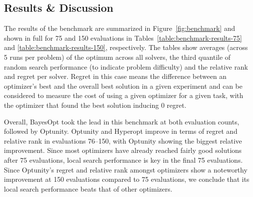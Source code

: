 \begin{subappendices}
\subsection{Results \& Discussion}
The results of the benchmark are summarized in Figure~\ref{fig:benchmark} and shown in full for 75 and 150 evaluations in Tables~\ref{table:benchmark-results-75} and \ref{table:benchmark-results-150}, respectively. The tables show averages (across 5 runs per problem) of the optimum across all solvers, the third quantile of random search performance (to indicate problem difficulty) and the relative rank and regret per solver. Regret in this case means the difference between an optimizer's best and the overall best solution in a given experiment and can be considered to measure the cost of using a given optimizer for a given task, with the optimizer that found the best solution inducing 0 regret.

Overall, BayesOpt took the lead in this benchmark at both evaluation counts, followed by Optunity. Optunity and Hyperopt improve in terms of regret and relative rank in evaluations 76--150, with Optunity showing the biggest relative improvement. Since most optimizers have already reached fairly good solutions after 75 evaluations, local search performance is key in the final 75 evaluations. Since Optunity's regret and relative rank amongst optimizers show a noteworthy improvement at 150 evaluations compared to 75 evaluations, we conclude that its local search performance beats that of other optimizers.


\end{subappendices}
